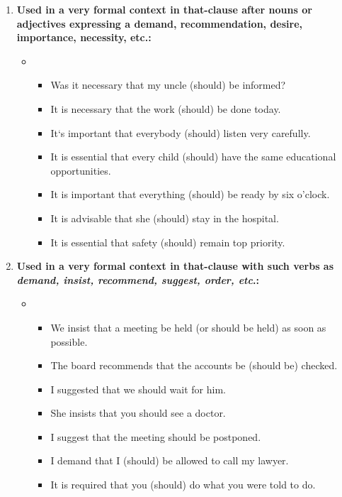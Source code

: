 \begin{enumerate}
      \item \textbf{Used in a very formal context in that-clause after nouns or adjectives expressing a demand, recommendation, desire, importance, necessity, etc.:}
            \begin{itemize}
                  \item {}
                        \begin{itemize}
                              \item Was it necessary that my uncle (should) be informed?
                              \item It is necessary that the work (should) be done today.
                              \item It`s important that everybody (should) listen very carefully.
                              \item It is essential that every child (should) have the same educational opportunities.
                              \item It is important that everything (should) be ready by six o'clock.
                              \item It is advisable that she (should) stay in the hospital.
                              \item It is essential that safety (should) remain top priority.
                        \end{itemize}
            \end{itemize}

      \item \textbf{Used in a very formal context in that-clause with such verbs as \textit{demand, insist, recommend, suggest, order, etc}.:}
            \begin{itemize}
                  \item {}
                        \begin{itemize}
                              \item We insist that a meeting be held (or should be held) as soon as possible.
                              \item The board recommends that the accounts be (should be) checked.
                              \item I suggested that we should wait for him.
                              \item She insists that you should see a doctor.
                              \item I suggest that the meeting should be postponed.
                              \item I demand that I (should) be allowed to call my lawyer.
                              \item It is required that you (should) do what you were told to do.
                        \end{itemize}
            \end{itemize}
\end{enumerate}

